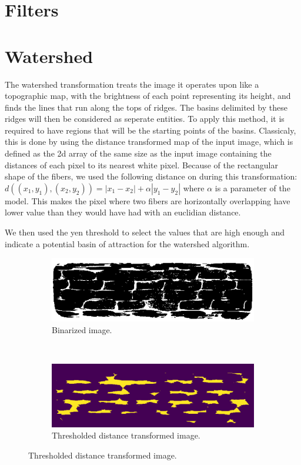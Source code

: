 \documentclass{report}
\begin{document}
\section{Filters}
\section{Watershed}
The watershed transformation treats the image it operates upon like a topographic map, with the brightness of each point representing its height, and finds the lines that run along the tops of ridges. The basins delimited by these ridges will then be considered as
seperate entities.\newline
To apply this method, it is required to have regions that will be the starting points of the basins.
\medskip
Classicaly, this is done by using the distance transformed map of the input image, which is defined as the 2d array
of the same size as the input image containing the distances of each pixel to its nearest white pixel.
\medskip\newline
Because of the rectangular shape of the fibers, we used the following distance on during this transformation:
$d((x_1,y_1),(x_2,y_2))=|x_1-x_2|+\alpha{|y_1-y_2|}$ where $\alpha$ is a parameter of the model.\newline
This makes the pixel where two fibers are horizontally overlapping have lower value than they would have had with an euclidian distance.

We then used the yen threshold to select the values that are high enough and indicate a potential basin of attraction for the watershed algorithm.
\begin{figure}[!h]
\centering
	\begin{subfigure}[b]{0.4\linewidth}
		\centering
		\includegraphics[width=\linewidth]{figures/Thibault/fibres_binar.png}
		\caption{Binarized image.}
	\end{subfigure}
~
	\begin{subfigure}[b]{0.4\linewidth}
		\centering
		\includegraphics[width=\linewidth]{figures/Thibault/fibres_distance.png}
	\caption{Thresholded distance transformed image.}
\end{subfigure}
\label{fig:binar}
\end{figure}
\end{document}
